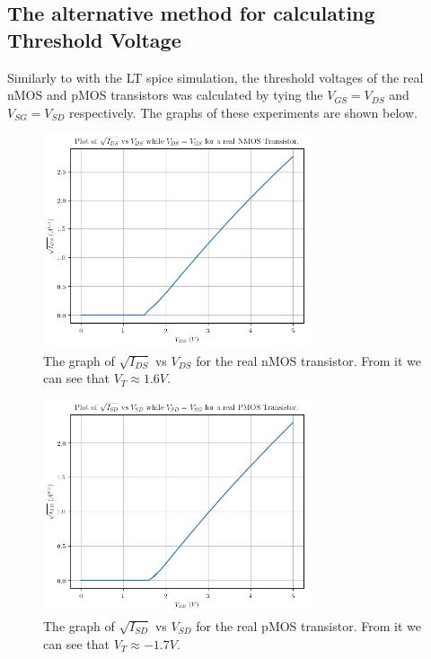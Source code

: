\documentclass[titlepage, 12pt]{article}
\begin{document}
    \subsection{The alternative method for calculating Threshold
    Voltage}
    Similarly to with the LT spice simulation, the threshold voltages of
    the real nMOS and pMOS transistors was calculated by tying the
    $V_{GS} = V_{DS}$ and $V_{SG} = V_{SD}$ respectively. The graphs of
    these experiments are shown below.
    \begin{figure}[H]
        \centering
        \includegraphics[width=0.7\textwidth]{figures/part_3_nsqrt.png}
        \caption{The graph of $\sqrt{I_{DS}}$ vs $V_{DS}$ for the real
        nMOS transistor. From it we can see that $V_T \approx 1.6V$.}
    \end{figure}
    \begin{figure}[H]
        \centering
        \includegraphics[width=0.7\textwidth]{figures/part_3_psqrt.png}
        \caption{The graph of $\sqrt{I_{SD}}$ vs $V_{SD}$ for the real
        pMOS transistor. From it we can see that $V_T \approx -1.7V$.}
    \end{figure}
\end{document}
